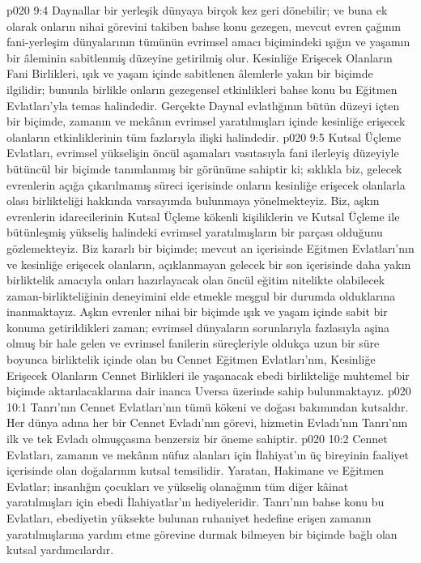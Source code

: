 \vs p020 9:4 Daynallar bir yerleşik dünyaya birçok kez geri dönebilir; ve buna ek olarak onların nihai görevini takiben bahse konu gezegen, mevcut evren çağının fani\hyp{}yerleşim dünyalarının tümünün evrimsel amacı biçimindeki ışığın ve yaşamın bir âleminin sabitlenmiş düzeyine getirilmiş olur. Kesinliğe Erişecek Olanların Fani Birlikleri, ışık ve yaşam içinde sabitlenen âlemlerle yakın bir biçimde ilgilidir; bununla birlikle onların gezegensel etkinlikleri bahse konu bu Eğitmen Evlatları’yla temas halindedir. Gerçekte Daynal evlatlığının bütün düzeyi içten bir biçimde, zamanın ve mekânın evrimsel yaratılmışları içinde kesinliğe erişecek olanların etkinliklerinin tüm fazlarıyla ilişki halindedir.
\vs p020 9:5 Kutsal Üçleme Evlatları, evrimsel yükselişin öncül aşamaları vasıtasıyla fani ilerleyiş düzeyiyle bütüncül bir biçimde tanımlanmış bir görünüme sahiptir ki; sıklıkla biz, gelecek evrenlerin açığa çıkarılmamış süreci içerisinde onların kesinliğe erişecek olanlarla olası birlikteliği hakkında varsayımda bulunmaya yönelmekteyiz. Biz, aşkın evrenlerin idarecilerinin Kutsal Üçleme kökenli kişiliklerin ve Kutsal Üçleme ile bütünleşmiş yükseliş halindeki evrimsel yaratılmışların bir parçası olduğunu gözlemekteyiz. Biz kararlı bir biçimde; mevcut an içerisinde Eğitmen Evlatları’nın ve kesinliğe erişecek olanların, açıklanmayan gelecek bir son içerisinde daha yakın birliktelik amacıyla onları hazırlayacak olan öncül eğitim nitelikte olabilecek zaman\hyp{}birlikteliğinin deneyimini elde etmekle meşgul bir durumda olduklarına inanmaktayız. Aşkın evrenler nihai bir biçimde ışık ve yaşam içinde sabit bir konuma getirildikleri zaman; evrimsel dünyaların sorunlarıyla fazlasıyla aşina olmuş bir hale gelen ve evrimsel fanilerin süreçleriyle oldukça uzun bir süre boyunca birliktelik içinde olan bu Cennet Eğitmen Evlatları’nın, Kesinliğe Erişecek Olanların Cennet Birlikleri ile yaşanacak ebedi birlikteliğe muhtemel bir biçimde aktarılacaklarına dair inanca Uversa üzerinde sahip bulunmaktayız.
\vs p020 10:1 Tanrı’nın Cennet Evlatları’nın tümü kökeni ve doğası bakımından kutsaldır. Her dünya adına her bir Cennet Evladı’nın görevi, hizmetin Evladı’nın Tanrı’nın ilk ve tek Evladı olmuşçasına benzersiz bir öneme sahiptir.
\vs p020 10:2 Cennet Evlatları, zamanın ve mekânın nüfuz alanları için İlahiyat’ın üç bireyinin faaliyet içerisinde olan doğalarının kutsal temsilidir. Yaratan, Hakimane ve Eğitmen Evlatlar; insanlığın çocukları ve yükseliş olanağının tüm diğer kâinat yaratılmışları için ebedi İlahiyatlar’ın hediyeleridir. Tanrı’nın bahse konu bu Evlatları, ebediyetin yüksekte bulunan ruhaniyet hedefine erişen zamanın yaratılmışlarına yardım etme görevine durmak bilmeyen bir biçimde bağlı olan kutsal yardımcılardır.
